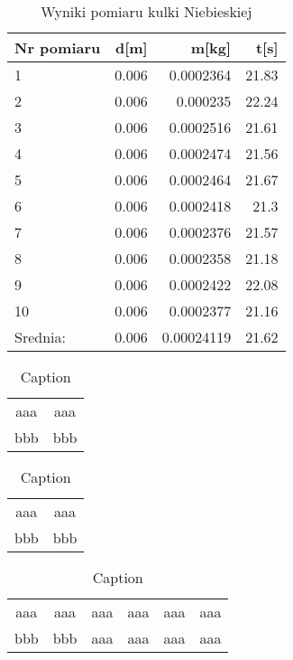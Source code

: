 \documentclass{article}
\begin{document}
\begin{center}
    \begin{table}[h]    
        \caption{Wyniki pomiaru kulki Niebieskiej}
        \centering
        \begin{tabular}{|l|r|r|r|}
            \hline
            Nr pomiaru & d[m] & m[kg] & t[s] \\ \hline
            1 & 0.006 & 0.0002364 & 21.83 \\ \hline
            2 & 0.006 & 0.000235  & 22.24 \\ \hline
            3 & 0.006 & 0.0002516 & 21.61 \\ \hline
            4 & 0.006 & 0.0002474 & 21.56 \\ \hline
            5 & 0.006 & 0.0002464 & 21.67 \\ \hline
            6 & 0.006 & 0.0002418 & 21.3  \\ \hline
            7 & 0.006 & 0.0002376 & 21.57 \\ \hline
            8 & 0.006 & 0.0002358 & 21.18 \\ \hline
            9 & 0.006 & 0.0002422 & 22.08 \\ \hline
            10& 0.006 & 0.0002377 & 21.16 \\ \hline
            Srednia: & 0.006 & 0.00024119 & 21.62 \\ \hline
        \end{tabular}%
        \label{tab:Tabela Pomiarow Kulki Niebieskiej}%
    \end{table}%
\end{center}
\newpage
\begin{multicols}{3}
    \begin{table}[h]
       \centering
       \begin{tabular}{c|c}
           aaa & aaa \\
           bbb & bbb
       \end{tabular}
       \caption{Caption}
       \label{tab:my_label}
    \end{table}
    \begin{table}[h]
       \centering
       \begin{tabular}{c|c}
           aaa & aaa \\
           bbb & bbb
       \end{tabular}
       \caption{Caption}
       \label{tab:my_label}
    \end{table}
    \begin{table}[h]
       \centering
       \begin{tabular}{c|c|c|c|c|c}
           aaa & aaa & aaa & aaa & aaa & aaa \\
           bbb & bbb & aaa & aaa & aaa & aaa
       \end{tabular}
       \caption{Caption}
       \label{tab:my_label}
    \end{table}
    \end{multicols}

\end{document}
